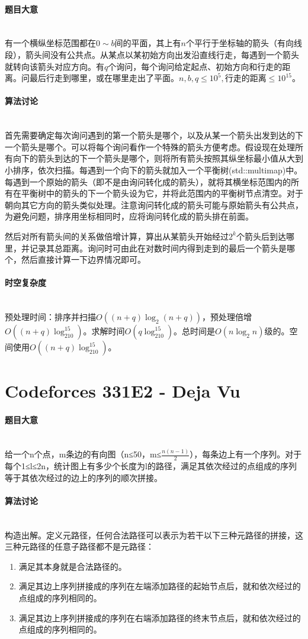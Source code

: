 \documentclass[UTF8]{ctexart}
\newcommand{\myparagraph}[1]{\paragraph{#1}\mbox{}\\}
\theoremstyle{nonumberplain}
\begin{document}
		\myparagraph{题目大意}
		
			有一个横纵坐标范围都在$0 \sim b$间的平面，其上有$n$个平行于坐标轴的箭头（有向线段），箭头间没有公共点。从某点以某初始方向出发沿直线行走，每遇到一个箭头就转向该箭头对应方向。有$q$个询问，每个询问给定起点、初始方向和行走的距离。问最后行走到哪里，或在哪里走出了平面。$n,b,q \leq 10^5, \mbox{行走的距离} \leq 10^{15}$。
		
		\myparagraph{算法讨论}
		
			首先需要确定每次询问遇到的第一个箭头是哪个，以及从某一个箭头出发到达的下一个箭头是哪个。可以将每个询问看作一个特殊的箭头方便考虑。假设现在处理所有向下的箭头到达的下一个箭头是哪个，则将所有箭头按照其纵坐标最小值从大到小排序，依次扫描。每遇到一个向下的箭头就加入一个平衡树(std::multimap)中。每遇到一个原始的箭头（即不是由询问转化成的箭头），就将其横坐标范围内的所有在平衡树中的箭头的下一个箭头设为它，并将此范围内的平衡树节点清空。对于朝向其它方向的箭头类似处理。注意询问转化成的箭头可能与原始箭头有公共点，为避免问题，排序用坐标相同时，应将询问转化成的箭头排在前面。
			
			然后对所有箭头间的关系做倍增计算，算出从某箭头开始经过$2^k$个箭头后到达哪里，并记录其总距离。询问时可由此在对数时间内得到走到的最后一个箭头是哪个，然后直接计算一下边界情况即可。
		
		\myparagraph{时空复杂度}
		
			预处理时间：排序并扫描$O((n+q)\log_2(n+q))$，预处理倍增$O((n+q)\log_210^{15})$。求解时间$O(q\log_210^{15})$。总时间是$O(n\log_2n)$级的。空间使用$O((n+q)\log_210^{15})$。
	
	\section{Codeforces 331E2 - Deja Vu}
		
		\myparagraph{题目大意}
		
			给一个n个点，m条边的有向图（n≤50，m≤$\frac{n(n-1)}{2}$），每条边上有一个序列。对于每个1≤l≤2n，统计图上有多少个长度为l的路径，满足其依次经过的点组成的序列等于其依次经过的边上的序列的顺次拼接。
			
		\myparagraph{算法讨论}
		
			构造出解。定义元路径，任何合法路径可以表示为若干以下三种元路径的拼接，这三种元路径的任意子路径都不是元路径：
			
			\begin{enumerate}
				\item 满足其本身就是合法路径的。
				\item 满足其边上序列拼接成的序列在左端添加路径的起始节点后，就和依次经过的点组成的序列相同的。
				\item 满足其边上序列拼接成的序列在右端添加路径的终末节点后，就和依次经过的点组成的序列相同的。
			\end{enumerate}
			
\end{document}
